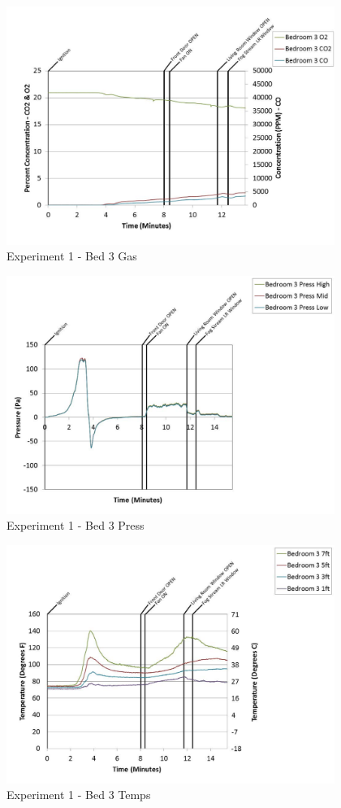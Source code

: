 \documentclass{article}
\begin{document}
\begin{appendices}
	\begin{figure}[h!]
		\centering
		\includegraphics[height=3.05in]{0_Images/Results_Charts/Exp_1_Charts/Bed3Gas.pdf}
		\caption{Experiment 1 - Bed 3 Gas}
	\end{figure}
 
	\clearpage

	\begin{figure}[h!]
		\centering
		\includegraphics[height=3.05in]{0_Images/Results_Charts/Exp_1_Charts/Bed3Press.pdf}
		\caption{Experiment 1 - Bed 3 Press}
	\end{figure}
 

	\begin{figure}[h!]
		\centering
		\includegraphics[height=3.05in]{0_Images/Results_Charts/Exp_1_Charts/Bed3Temps.pdf}
		\caption{Experiment 1 - Bed 3 Temps}
	\end{figure}
 

\end{appendices}
\end{document}
